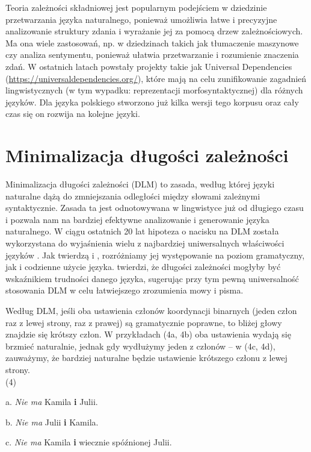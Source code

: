 \documentclass[licencjacka]{pracamgr_Kogni}
\begin{document}
Teoria zależności składniowej jest popularnym podejściem w dziedzinie przetwarzania języka naturalnego, ponieważ umożliwia łatwe i precyzyjne analizowanie struktury zdania i wyrażanie jej za pomocą drzew zależnościowych. Ma ona wiele zastosowań, np. w dziedzinach takich jak tłumaczenie maszynowe czy analiza sentymentu, ponieważ ułatwia przetwarzanie i rozumienie znaczenia zdań. W ostatnich latach powstały projekty takie jak Universal Dependencies (\url{https://universaldependencies.org/}), które mają na celu zunifikowanie zagadnień lingwistycznych (w tym wypadku: reprezentacji morfosyntaktycznej) dla różnych języków. Dla języka polskiego stworzono już kilka wersji tego korpusu \citep{Przepiorkowski2020} oraz cały czas się on rozwija na kolejne języki.

\section{Minimalizacja długości zależności}
Minimalizacja długości zależności (DLM) to zasada, według której języki naturalne dążą do zmniejszania odległości między słowami zależnymi syntaktycznie. Zasada ta jest odnotowywana w lingwistyce już od długiego czasu i pozwala nam na bardziej efektywne analizowanie i generowanie języka naturalnego. W ciągu ostatnich 20 lat hipoteza o nacisku na DLM została wykorzystana do wyjaśnienia wielu z najbardziej uniwersalnych właściwości języków \citep{FutrellEtAl2015}.
Jak twierdzą \citet{Hawkins1994} i \citet{FutrellEtAl2020}, rozróżniamy jej występowanie na poziom gramatyczny, jak i codzienne użycie języka. \citet{Liu2008} twierdzi, że długości zależności mogłyby być wskaźnikiem trudności danego języka, sugerując przy tym pewną uniwersalność stosowania DLM w celu łatwiejszego zrozumienia mowy i pisma.

Według DLM, jeśli oba ustawienia członów koordynacji binarnych (jeden człon raz z lewej strony, raz z prawej) są gramatycznie poprawne, to bliżej głowy znajdzie się krótszy człon. W przykładach (4a, 4b) oba ustawienia wydają się brzmieć naturalnie, jednak gdy wydłużymy jeden z członów -- w (4c, 4d), zauważymy, że bardziej naturalne będzie ustawienie krótszego członu z lewej strony.
\\

(4)

a. \textit{Nie ma} Kamila \textbf{i} Julii.

b. \textit{Nie ma} Julii \textbf{i} Kamila.

c. \textit{Nie ma} Kamila \textbf{i} wiecznie spóźnionej Julii.
\end{document}
